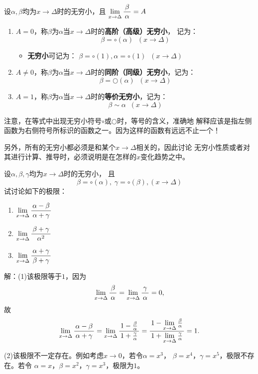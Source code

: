 \begin{thx}
	设$\alpha,\beta$均为$x\to\Delta$时的无穷小，且
	$\lim\limits_{x\to{\Delta}}\displaystyle\frac{\,{\beta}\,}{\,{\alpha}\,}=A$
	\begin{enumerate}[(1)]
	  \item $A=0$，称$\beta$为$\alpha$当$x\to\Delta$时的{\bf 高阶（高级）无穷小}，
	  记为：
	  $$\beta=\circ(\alpha)\;\;(x\to\Delta)$$
	  \begin{itemize}
	    \item {\bf 无穷小}可记为：
	    $\beta=\circ(1),\alpha=\circ(1)\;\;(x\to\Delta)$
	  \end{itemize}
	  \item $A\ne 0$，称$\beta$为$\alpha$当$x\to\Delta$时的{\bf 同阶（同级）无穷小}，记为：
	  $$\beta=\bigcirc(\alpha)\;\;(x\to\Delta)$$
	  \item $A=1$，称$\beta$为$\alpha$当$x\to\Delta$时的{\bf 等价无穷小}，记为：
	  $$\beta\sim \alpha\;\;(x\to\Delta)$$
	\end{enumerate}
\end{thx}
注意，在等式中出现无穷小符号$\circ$或$\bigcirc$时，等号的含义，准确地
解释应该是指左侧函数为右侧符号所标识的函数之一。因为这样的函数有远远不止一个！

另外，所有的无穷小都必须是和某个$x\to\Delta$相关的，因此讨论
无穷小性质或者对其进行计算、推导时，必须说明是在怎样的$x$变化趋势之中。

\egz 设$\alpha,\beta,\gamma$均为$x\to\Delta$时的无穷小，
且
$$\beta=\circ(\alpha),\;\gamma=\circ(\beta),(x\to\Delta)$$
试讨论如下的极限：
\begin{enumerate}[(1)]
	\setlength{\itemindent}{1cm}
	\item $\lim\limits_{x\to{\Delta}}\displaystyle\frac{\,{\alpha-\beta}\,}{\,{\alpha+\gamma}\,}$
	\item $\lim\limits_{x\to{\Delta}}\displaystyle\frac{\,{\beta+\gamma}\,}{\,{\alpha^2}\,}$
	\item $\lim\limits_{x\to{\Delta}}\displaystyle\frac{\,{\alpha+\gamma}\,}{\,{\beta+\gamma}\,}$
\end{enumerate}

解：(1)该极限等于$1$，因为
$$\lim\limits_{x\to{\Delta}}\displaystyle\frac{\,{\beta}\,}{\,{\alpha}\,}
=\lim\limits_{x\to{\Delta}}\displaystyle\frac{\,{\gamma}\,}{\,{\alpha}\,}=0,$$
故
\begin{align*}
	\lim\limits_{x\to{\Delta}}\displaystyle\frac{\,{\alpha-\beta}\,}{\,{\alpha+\gamma}\,}
	=\lim\limits_{x\to{\Delta}}\displaystyle\frac{\,{1-\frac{\beta}{\alpha}}\,}{\,{1+\frac{\gamma}{\alpha}}\,}
	=\displaystyle\frac{\,{1-\lim\limits_{x\to{\Delta}}\frac{\beta}{\alpha}}\,}{\,{1+\lim\limits_{x\to{\Delta}}\frac{\gamma}{\alpha}}\,}=1.
\end{align*}

(2)该极限不一定存在。例如考虑$x\to0$，若令$\alpha=x^3$，
$\beta=x^4$，$\gamma=x^5$，极限不存在。若令
$\alpha=x$，$\beta=x^2$，$\gamma=x^3$，极限为$1$。

